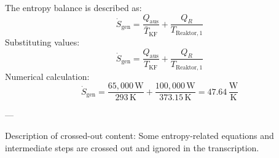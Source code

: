 The entropy balance is described as:  
\[
\dot{S}_{\text{gen}} = \frac{Q_{\text{aus}}}{\bar{T}_{\text{KF}}} + \frac{Q_R}{T_{\text{Reaktor},1}}
\]  
Substituting values:  
\[
\dot{S}_{\text{gen}} = \frac{Q_{\text{aus}}}{T_{\text{KF}}} + \frac{Q_R}{T_{\text{Reaktor},1}}
\]  
Numerical calculation:  
\[
\dot{S}_{\text{gen}} = \frac{65,000 \, \text{W}}{293 \, \text{K}} + \frac{100,000 \, \text{W}}{373.15 \, \text{K}} = 47.64 \, \frac{\text{W}}{\text{K}}
\]  

---

Description of crossed-out content:  
Some entropy-related equations and intermediate steps are crossed out and ignored in the transcription.